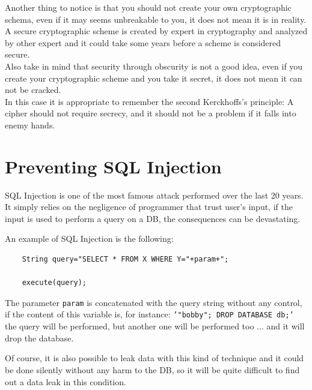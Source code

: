 Another thing to notice is that you should not create your own cryptographic schema, even if it may seems unbreakable to you, it does not mean it is in reality.\\
A secure cryptographic scheme is created by expert in cryptography and analyzed by other expert and it could take some years before a scheme is considered secure.\\
Also take in mind that security through obscurity is not a good idea, even if you create your cryptographic scheme and you take it secret, it does not mean it can not be cracked.\\
In this case it is appropriate to remember the second Kerckhoffs's principle:
A cipher should not require secrecy, and it should not be a problem if it falls into enemy hands.\\

\section{Preventing SQL Injection}
SQL Injection is one of the most famous attack performed over the last 20 years.\newline
It simply relies on the negligence of programmer that trust user's input, if the input is used to perform
a query on a DB, the consequences can be devastating.\newline

An example of SQL Injection is the following:

\begin{lstlisting}
	String query="SELECT * FROM X WHERE Y="+param+";
	
	execute(query);
\end{lstlisting} 

The parameter \texttt{param} is concatenated with the query string without any control, if the content of this variable is, for instance:
\texttt{'"bobby"; DROP DATABASE db;'} the query will be performed, but another one will be performed too ... and it will drop the database.\newline

Of course, it is also possible to leak data with this kind of technique and it could be done silently without any harm to the DB, so it will be quite difficult to
find out a data leak in this condition.\newline

